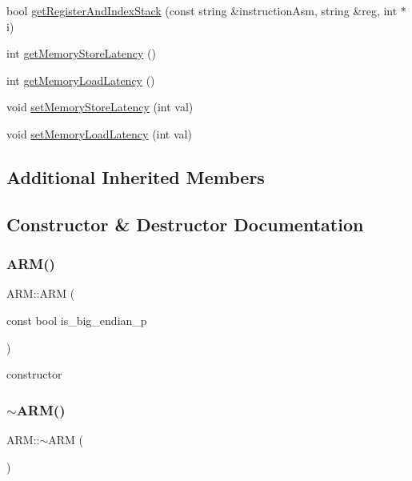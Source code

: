 \begin{DoxyCompactItemize}
\item 
bool \hyperlink{classARM_a19df5de29d005c2629ea2e02f3312ccf}{get\+Register\+And\+Index\+Stack} (const string \&instruction\+Asm, string \&reg, int $\ast$i)
\item 
int \hyperlink{classARM_a6ae1ddccf77484346590d15bf21ccba8}{get\+Memory\+Store\+Latency} ()
\item 
int \hyperlink{classARM_a39ad50b9e5d9909bd1f7c0ecbde69f25}{get\+Memory\+Load\+Latency} ()
\item 
void \hyperlink{classARM_ab7fdb3a96c6a785bd70a0b035a88b612}{set\+Memory\+Store\+Latency} (int val)
\item 
void \hyperlink{classARM_af9a9f3ab8e708795e6721af9de0f956e}{set\+Memory\+Load\+Latency} (int val)
\end{DoxyCompactItemize}
\subsection*{Additional Inherited Members}


\subsection{Constructor \& Destructor Documentation}
\mbox{\label{classARM_a2b446b24478914f836c90c1aea2cb7da}} 
\subsubsection{\texorpdfstring{A\+R\+M()}{ARM()}}
{\footnotesize\ttfamily A\+R\+M\+::\+A\+RM (\begin{DoxyParamCaption}\item[{const bool}]{is\+\_\+big\+\_\+endian\+\_\+p }\end{DoxyParamCaption})}

constructor \mbox{\label{classARM_aee5c7c910009cb5d6fa8a81f8ac23be0}} 
\subsubsection{\texorpdfstring{$\sim$\+A\+R\+M()}{~ARM()}}
{\footnotesize\ttfamily A\+R\+M\+::$\sim$\+A\+RM (\begin{DoxyParamCaption}{ }\end{DoxyParamCaption})}


